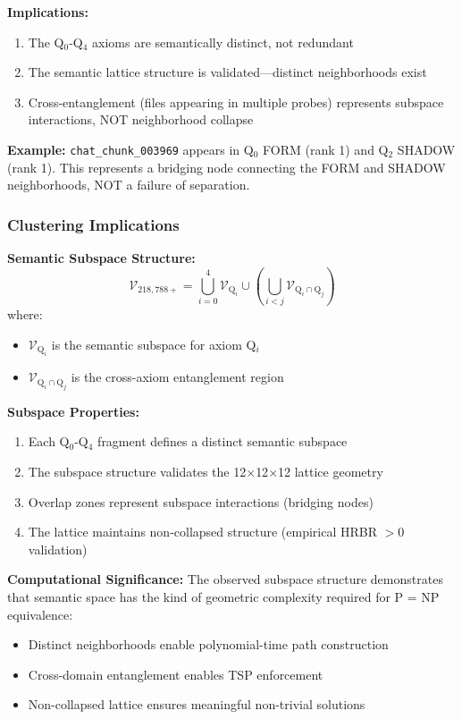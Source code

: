\documentclass[11pt, letterpaper]{article}
\begin{document}
\textbf{Implications:}
\begin{enumerate}
    \item The Q$_0$-Q$_4$ axioms are semantically distinct, not redundant
    \item The semantic lattice structure is validated—distinct neighborhoods exist
    \item Cross-entanglement (files appearing in multiple probes) represents subspace interactions, NOT neighborhood collapse
\end{enumerate}

\textbf{Example:} \texttt{chat\_chunk\_003969} appears in Q$_0$ FORM (rank 1) and Q$_2$ SHADOW (rank 1). This represents a bridging node connecting the FORM and SHADOW neighborhoods, NOT a failure of separation.

\subsubsection{Clustering Implications}

\textbf{Semantic Subspace Structure:}
\begin{equation}
\mathcal{V}_{218,788+} = \bigcup_{i=0}^{4} \mathcal{V}_{\text{Q}_i} \cup \left(\bigcup_{i < j} \mathcal{V}_{\text{Q}_i \cap \text{Q}_j}\right)
\end{equation}
where:
\begin{itemize}
    \item $\mathcal{V}_{\text{Q}_i}$ is the semantic subspace for axiom Q$_i$
    \item $\mathcal{V}_{\text{Q}_i \cap \text{Q}_j}$ is the cross-axiom entanglement region
\end{itemize}

\textbf{Subspace Properties:}
\begin{enumerate}
    \item Each Q$_0$-Q$_4$ fragment defines a distinct semantic subspace
    \item The subspace structure validates the 12$\times$12$\times$12 lattice geometry
    \item Overlap zones represent subspace interactions (bridging nodes)
    \item The lattice maintains non-collapsed structure (empirical HRBR $> 0$ validation)
\end{enumerate}

\textbf{Computational Significance:}
The observed subspace structure demonstrates that semantic space has the kind of geometric complexity required for P = NP equivalence:
\begin{itemize}
    \item Distinct neighborhoods enable polynomial-time path construction
    \item Cross-domain entanglement enables TSP enforcement
    \item Non-collapsed lattice ensures meaningful non-trivial solutions
\end{itemize}
\end{document}
